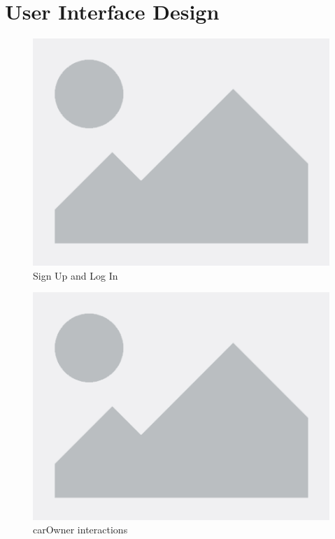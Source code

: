 \documentclass[table, 12pt]{article}
\begin{document}
\section{User Interface Design}
\begin{center}
    \begin{figure}[H]
        \includegraphics[scale=0.74, center]{assets/placeholder.png}
        \caption{Sign Up and Log In}
        \label{fig: signMockup}
    \end{figure}
\end{center}

\begin{center}
    \begin{figure}[H]
        \vspace{-50px}
        \includegraphics[scale=0.6, center]{assets/placeholder.png}
        \caption{carOwner interactions}
        \label{fig: agroMockup}
    \end{figure}
\end{center}
\end{document}

